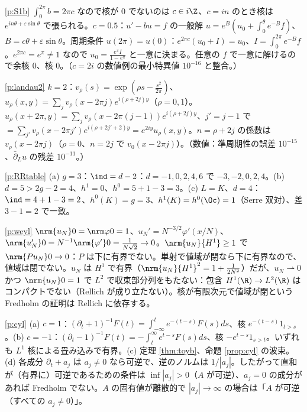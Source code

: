 \begin{sol}{\ref{p:S1b}}
$\int_0^{2\pi}b=2\pi c$ なので核が $0$ でないのは $c\in i\Z$、$c=in$ のとき核は $e^{in\theta+\varepsilon\sin\theta}$ で張られる。$c=0.5$：$u'-bu=f$ の一般解 $u=e^{B}(u_0+\int_0^\theta e^{-B}f)$、$B=c\theta+\varepsilon\sin\theta$。周期条件 $u(2\pi)=u(0)$：$e^{2\pi c}(u_0+I)=u_0$、$I=\int_0^{2\pi}e^{-B}f$。$e^{2\pi c}=e^\pi\ne1$ なので $u_0=\frac{e^{\pi}I}{1-e^{\pi}}$ と一意に決まる。任意の $f$ で一意に解けるので余核 $0$、核 $0$。（$c=2i$ の数値例の最小特異値 $10^{-16}$ と整合。）
\end{sol}
\begin{sol}{\ref{p:landau2}}
$k=2$：$v_\rho(s)=\exp(\rho s-\frac{s^2}{2\pi})$、$u_\rho(x,y)=\sum_jv_\rho(x-2\pi j)e^{i(\rho+2j)y}$（$\rho=0,1$）。$u_\rho(x+2\pi,y)=\sum_jv_\rho(x-2\pi(j-1))e^{i(\rho+2j)y}$、$j'=j-1$ で $=\sum_{j'}v_\rho(x-2\pi j')e^{i(\rho+2j'+2)y}=e^{2iy}u_\rho(x,y)$。$n=\rho+2j$ の係数は $v_\rho(x-2\pi j)$（$\rho=0$、$n=2j$ で $v_0(x-2\pi j)$）。（数値：準周期性の誤差 $10^{-15}$、$\bar\partial_Lu$ の残差 $10^{-11}$。）
\end{sol}
\begin{sol}{\ref{p:RRtable}}
(a) $g=3$：$\ind=d-2$：$d=-1,0,2,4,6$ で $-3,-2,0,2,4$。(b) $d=5>2g-2=4$、$h^1=0$、$h^0=5+1-3=3$。(c) $L=K$、$d=4$：$\ind=4+1-3=2$、$h^0(K)=g=3$、$h^1(K)=h^0(\Oc)=1$（Serre 双対）、差 $3-1=2$ で一致。
\end{sol}
\begin{sol}{\ref{p:weyl}}
$\nrm{u_N}0=\nrm\varphi0=1$、$u_N'=N^{-3/2}\varphi'(x/N)$、$\nrm{u_N'}0=N^{-1}\nrm{\varphi'}0=\frac1{N\sqrt2}\to0$。$\nrm{u_N}{H^1}\ge1$ で $\nrm{Pu_N}0\to0$：$P$ は下に有界でない。単射で値域が閉なら下に有界なので、値域は閉でない。$u_N$ は $H^1$ で有界（$\nrm{u_N}{H^1}^2=1+\frac1{2N^2}$）だが、$u_N\rightharpoonup0$ かつ $\nrm{u_N}0=1$ で $L^2$ で収束部分列をもたない：包含 $H^1(\R)\to L^2(\R)$ はコンパクトでない（Rellich が成り立たない）。核が有限次元で値域が閉という Fredholm の証明は Rellich に依存する。
\end{sol}
\begin{sol}{\ref{p:cyl}}
(a) $c=1$：$(\partial_t+1)^{-1}F(t)=\int_{-\infty}^te^{-(t-s)}F(s)ds$、核 $e^{-(t-s)}1_{t>s}$。(b) $c=-1$：$(\partial_t-1)^{-1}F(t)=-\int_t^\infty e^{t-s}F(s)ds$、核 $-e^{t-s}1_{s>t}$。いずれも $L^1$ 核による畳み込みで有界。(c) 定理 \ref{thm:toyb}、命題 \ref{prop:cyl} の波束。(d) 各成分 $\partial_t+a_j$ は $a_j\ne0$ なら可逆で、逆のノルムは $1/|a_j|$。したがって直和が（有界に）可逆であるための条件は $\inf|a_j|>0$（$A$ が可逆）、$a_j=0$ の成分があれば Fredholm でない。$A$ の固有値が離散的で $|a_j|\to\infty$ の場合は「$A$ が可逆（すべての $a_j\ne0$）」。
\end{sol}
